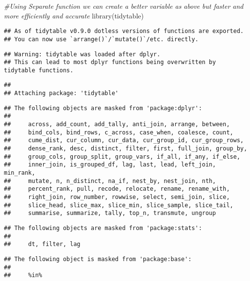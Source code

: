 \documentclass[
]{article}
\newenvironment{Shaded}{\begin{snugshade}}{\end{snugshade}}
\newcommand{\CommentTok}[1]{\textcolor[rgb]{0.56,0.35,0.01}{\textit{#1}}}
\newcommand{\FunctionTok}[1]{\textcolor[rgb]{0.00,0.00,0.00}{#1}}
\newcommand{\NormalTok}[1]{#1}
\begin{document}
\begin{Shaded}
\begin{Highlighting}[]
\CommentTok{\#Using Separate function we can create a better variable as above but faster and more efficiently and accurate}
\FunctionTok{library}\NormalTok{(tidytable)}
\end{Highlighting}
\end{Shaded}

\begin{verbatim}
## As of tidytable v0.9.0 dotless versions of functions are exported.
## You can now use `arrange()`/`mutate()`/etc. directly.
\end{verbatim}

\begin{verbatim}
## Warning: tidytable was loaded after dplyr.
## This can lead to most dplyr functions being overwritten by tidytable functions.
\end{verbatim}

\begin{verbatim}
## 
## Attaching package: 'tidytable'
\end{verbatim}

\begin{verbatim}
## The following objects are masked from 'package:dplyr':
## 
##     across, add_count, add_tally, anti_join, arrange, between,
##     bind_cols, bind_rows, c_across, case_when, coalesce, count,
##     cume_dist, cur_column, cur_data, cur_group_id, cur_group_rows,
##     dense_rank, desc, distinct, filter, first, full_join, group_by,
##     group_cols, group_split, group_vars, if_all, if_any, if_else,
##     inner_join, is_grouped_df, lag, last, lead, left_join, min_rank,
##     mutate, n, n_distinct, na_if, nest_by, nest_join, nth,
##     percent_rank, pull, recode, relocate, rename, rename_with,
##     right_join, row_number, rowwise, select, semi_join, slice,
##     slice_head, slice_max, slice_min, slice_sample, slice_tail,
##     summarise, summarize, tally, top_n, transmute, ungroup
\end{verbatim}

\begin{verbatim}
## The following objects are masked from 'package:stats':
## 
##     dt, filter, lag
\end{verbatim}

\begin{verbatim}
## The following object is masked from 'package:base':
## 
##     %in%
\end{verbatim}
\end{document}
